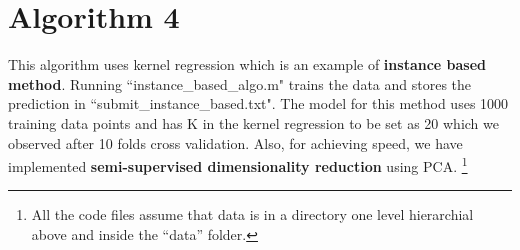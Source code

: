 \documentclass[a4paper, 11pt]{article}
\begin{document}
\section*{Algorithm 4}
This algorithm uses kernel regression which is an example of \textbf{instance based method}. Running ``instance\_based\_algo.m"  trains the data and stores the prediction in ``submit\_instance\_based.txt". The model for this method uses 1000 training data points and has K in the kernel regression to be set as 20 which we observed after 10 folds cross validation. Also, for achieving speed, we have implemented \textbf{semi-supervised dimensionality reduction} using PCA. \footnote{All the code files assume that data is in a directory one level hierarchial above and inside the ``data'' folder. }
\end{document}
